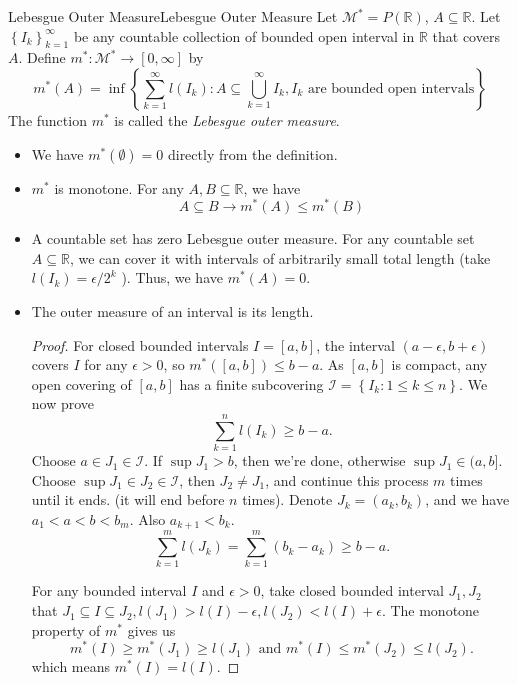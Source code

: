 \documentclass[../main.tex]{subfiles}
\begin{document}
\begin{definition}{Lebesgue Outer Measure}{Lebesgue Outer Measure}
Let $\mathcal{M}^* = P(\mathbb{R})$, $A \subseteq \mathbb{R}$. Let $\left\{ I_k \right\}_{k=1}^{\infty }$ be any countable collection of bounded open interval in $\mathbb{R}$ that covers $A$. Define $m^* : \mathcal{M}^* \rightarrow [0,\infty ]$ by
	\begin{equation*}
		m^*(A) = \inf \left\{ \sum_{k=1}^{\infty } l(I_k) : A \subseteq \bigcup_{k=1}^{\infty } I_k, I_k \text{ are bounded open intervals} \right\}
	\end{equation*}
	The function $m^*$ is called the \emph{Lebesgue outer measure}.
\end{definition}
\begin{itemize}
\item We have $m^*(\emptyset )=0$ directly from the definition.
\item $m^*$ is monotone. For any $A,B \subseteq \mathbb{R}$, we have
	\begin{equation*}
		A \subseteq B \rightarrow m^*(A) \leq m^*(B)
	\end{equation*}
\item A countable set has zero Lebesgue outer measure. For any countable set $A \subseteq \mathbb{R}$, we can cover it with intervals of arbitrarily small total length (take $l(I_k) = \epsilon / 2^k$ ). Thus, we have $m^*(A)=0$.
\item The outer measure of an interval is its length.
	\begin{proof}
		For closed bounded intervals $I = [a, b]$, the interval $(a-\epsilon,b+\epsilon)$ covers $I$ for any $\epsilon>0$, so $m^*([a,b]) \leq b-a$. As $[a,b]$ is compact, any open covering of $[a,b]$ has a finite subcovering $\mathcal{I} = \left\{ I_k: 1\leq k\leq n \right\}$. We now prove
		\begin{equation*}
		\sum_{k=1}^{n} l(I_k) \geq b-a.
		\end{equation*}
		Choose $a\in J_1\in \mathcal{I}$. If $\sup J_1>b$, then we're done, otherwise $\sup J_1\in (a,b]$. Choose $\sup J_1\in J_2\in \mathcal{I}$, then $J_2\neq J_1$, and continue this process $m$ times until it ends. (it will end before $n$ times). Denote $J_k = (a_k,b_k)$, and we have $a_1<a<b<b_m$. Also $a _{k+1} < b_k$.
		\begin{equation*}
			\sum_{k=1}^{m} l(J_k) = \sum_{k=1}^{m} (b_k-a_k) \geq b-a.
		\end{equation*}

		For any bounded interval $I$ and $\epsilon>0$, take closed bounded interval $J_1,J_2$ that $J_1 \subseteq I \subseteq J_2, l(J_1)> l(I)- \epsilon, l(J_2)<l(I)+ \epsilon$. The monotone property of $m^*$ gives us
		\begin{equation*}
			m^*(I) \geq m^*(J_1) \geq l(J_1) \text{ and } m^*(I) \leq m^*(J_2) \leq l(J_2).
		\end{equation*}
		which means $m^*(I) = l(I)$.


\end{proof}
\end{itemize}
\end{document}
